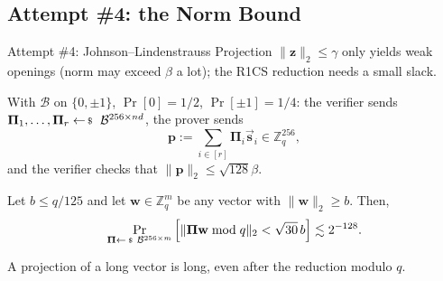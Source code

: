 \documentclass{zkdl-presentation-template}
\begin{document}
    \subsection{Attempt \#4: the Norm Bound}

    \begin{frame}{Attempt \#4: Johnson--Lindenstrauss Projection}
        $\|\mathbf{z}\|_2 \leq \gamma$ only yields weak openings (norm may exceed $\beta$ a lot); the R1CS reduction needs a small slack.
        \pause

        With $\mathcal{B}$ on $\{0, \pm 1\}$, $\Pr[0] = 1/2$, $\Pr[\pm 1] = 1/4$: the verifier sends $\boldsymbol{\Pi}_1, \dots, \boldsymbol{\Pi}_r \leftarrowS \mathcal{B}^{256 \times nd}$, the prover sends
        \begin{equation*}
            \mathbf{p} := \sum_{i \in [r]} \boldsymbol{\Pi}_i\vec{\mathbf{s}}_i \in \mathbb{Z}_q^{256},
        \end{equation*}
        and the verifier checks that $\|\mathbf{p}\|_2 \leq \sqrt{128}\beta$.
        \pause

        \begin{lemma}
            Let $b \leq q/125$ and let $\mathbf{w} \in \mathbb{Z}_q^m$ be any vector with $\|\mathbf{w}\|_2 \geq b$. Then,
            \begin{equation*}
                \Pr_{\boldsymbol{\Pi} \leftarrowS \mathcal{B}^{256 \times m}}\Big[\|\boldsymbol{\Pi}\mathbf{w} \bmod q\|_2 < \sqrt{30}\,b\Big] \lesssim 2^{-128}.
            \end{equation*}
        \end{lemma}
        A projection of a long vector is long, even after the reduction modulo $q$.
    \end{frame}
\end{document}
